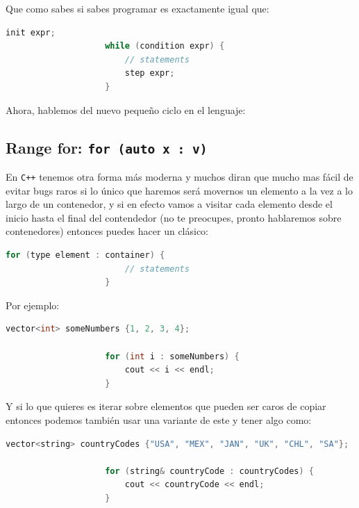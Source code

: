 \documentclass[12pt, fleqn]{report}                             %
\theoremstyle{break}                                            %
\newcommand{\textCode}[1]  { \texttt{#1} }                      %
\newcommand \Cpp  {\textCode{C++} }                               %
\begin{document}
                Que como sabes si sabes programar es exactamente igual que:
                \begin{lstlisting}[language=C++, gobble=20]
                    init expr;
                    while (condition expr) {
                        // statements
                        step expr;
                    }
                \end{lstlisting}

                Ahora, hablemos del nuevo pequeño ciclo en el lenguaje:

            \subsection{Range for: \textCode{for (auto x : v)}}

                En \Cpp tenemos otra forma más moderna y muchos diran que mucho mas
                fácil de evitar bugs raros si lo único que haremos será movernos un 
                elemento a la vez a lo largo de un contenedor, y si en efecto vamos a visitar cada
                elemento desde el inicio hasta el final del contendedor (no te preocupes, pronto
                hablaremos sobre contenedores) entonces puedes hacer un clásico:
                \begin{lstlisting}[language=C++, gobble=20]
                    for (type element : container) {
                        // statements
                    }
                \end{lstlisting}

                Por ejemplo:
                \begin{lstlisting}[language=C++, gobble=20]
                    vector<int> someNumbers {1, 2, 3, 4};

                    for (int i : someNumbers) {
                        cout << i << endl;
                    }
                \end{lstlisting}

                Y si lo que quieres es iterar sobre elementos que pueden ser caros de copiar entonces
                podemos también usar una variante de este y tener algo como:
                \begin{lstlisting}[language=C++, gobble=20]
                    vector<string> countryCodes {"USA", "MEX", "JAN", "UK", "CHL", "SA"};

                    for (string& countryCode : countryCodes) {
                        cout << countryCode << endl;
                    }
                \end{lstlisting}
\end{document}
